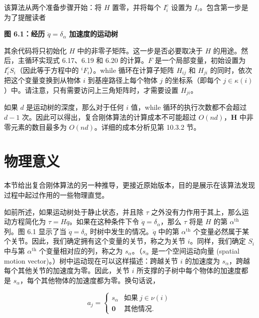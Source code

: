 \documentclass[10pt,a4paper]{book}
\theoremstyle{thmstyle} %
\theoremstyle{defstyle} %
\theoremstyle{prostyle} %
\begin{document}
该算法从两个准备步骤开始：将 $H$ 置零，并将每个 $I_i^c$ 设置为 $I_i$。包含第一步是为了提醒读者



\noindent\textbf{图 6.1：经历 $\ddot{q}=\delta_{\alpha}$ 加速度的运动树}





其余代码将只初始化 $H$ 中的非零子矩阵。这一步是否必要取决于 $H$ 的用途。然后，主循环实现式 6.17、6.19 和 6.20 的计算。$F$ 是一个局部变量，初始设置为 $I_{i}^{c}S_{i}$（因此等于方程中的 $^{i}F_{i}$）。while 循环在计算子矩阵 $H_{ij}$ 和 $H_{ji}$ 的同时，依次把这个变量变换到从物体 $i$ 到基座路径上每个物体 $j$ 的坐标系（即每个 $j \in \kappa(i)$）中。请注意，只有需要访问上三角矩阵时，才需要设置 $H_{ji}$。



如果 $d$ 是运动树的深度，那么对于任何 $i$ 值，while 循环的执行次数都不会超过 $d-1$ 次。因此可以得出，复合刚体算法的计算成本不可能超过 $O(nd)$，$\mathbf{H}$ 中非零元素的数目最多为 $O(nd)$。详细的成本分析见第 10.3.2 节。



\section{物理意义}





本节给出复合刚体算法的另一种推导，更接近原始版本，目的是展示在该算法发现过程中起过作用的一些物理直觉。



如前所述，如果运动树处于静止状态，并且除 $\tau$ 之外没有力作用于其上，那么运动方程简化为 $\tau = H\ddot{q}$。如果在这种条件下令 $\ddot{q} = \delta_{\alpha}$，那么 $\tau$ 将是 $H$ 的第 $\alpha^{\text{th}}$ 列。图 6.1 显示了当 $\ddot{q} = \delta_{\alpha}$ 时树中发生的情况。$\ddot{q}$ 中的第 $\alpha^{\text{th}}$ 个变量必然属于某个关节。因此，我们确定拥有这个变量的关节，称之为关节 $i$。同样，我们确定 $S_i$ 中与第 $\alpha^{\text{th}}$ 个变量相对应的列，称之为 $s_{\alpha}$。（$s_{\alpha}$ 是一个空间运动向量 (spatial motion vector)。）树中运动现在可以这样描述：跨越关节 $i$ 的加速度为 $s_{\alpha}$，跨越每个其他关节的加速度为零。因此，关节 $i$ 所支撑的子树中每个物体的加速度都是 $s_{\alpha}$，每个其他物体的加速度都为零。换句话说，



$$
a _ { j } = \left\{ \begin{array}{ll} { s _ { \alpha } } & {\text{如果}~ j \in \nu ( i )} \\{ \mathbf { 0 } } & \text{其他情况} . \end{array} \right.
$$
\end{document}
